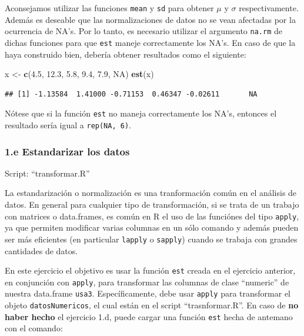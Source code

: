 \documentclass[]{article}
\newenvironment{Shaded}{}{}
\newcommand{\KeywordTok}[1]{\textcolor[rgb]{0.00,0.44,0.13}{\textbf{{#1}}}}
\newcommand{\FloatTok}[1]{\textcolor[rgb]{0.25,0.63,0.44}{{#1}}}
\newcommand{\OtherTok}[1]{\textcolor[rgb]{0.00,0.44,0.13}{{#1}}}
\newcommand{\NormalTok}[1]{{#1}}
\begin{document}
Aconsejamos utilizar las funciones \texttt{mean} y \texttt{sd} para
obtener $\mu$ y $\sigma$ respectivamente. Además es deseable que las
normalizaciones de datos no se vean afectadas por la ocurrencia de NA's.
Por lo tanto, es necesario utilizar el argumento \texttt{na.rm} de
dichas funciones para que \texttt{est} maneje correctamente los NA's. En
caso de que la haya construido bien, debería obtener resultados como el
siguiente:

\begin{Shaded}
\begin{Highlighting}[]
\NormalTok{x <- }\KeywordTok{c}\NormalTok{(}\FloatTok{4.5}\NormalTok{, }\FloatTok{12.3}\NormalTok{, }\FloatTok{5.8}\NormalTok{, }\FloatTok{9.4}\NormalTok{, }\FloatTok{7.9}\NormalTok{, }\OtherTok{NA}\NormalTok{)}
\KeywordTok{est}\NormalTok{(x)}
\end{Highlighting}
\end{Shaded}
\begin{verbatim}
## [1] -1.13584  1.41000 -0.71153  0.46347 -0.02611       NA
\end{verbatim}
Nótese que si la función \texttt{est} no maneja correctamente los NA's,
entonces el resultado sería igual a \texttt{rep(NA, 6)}.

\subsubsection{1.e Estandarizar los datos}

Script: ``transformar.R''

La estandarización o normalización es una tranformación común en el
análisis de datos. En general para cualquier tipo de transformación, si
se trata de un trabajo con matrices o data.frames, es común en R el uso
de las funciónes del tipo \texttt{apply}, ya que permiten modificar
varias columnas en un sólo comando y además pueden ser más eficientes
(en particular \texttt{lapply} o \texttt{sapply}) cuando se trabaja con
grandes cantidades de datos.

En este ejercicio el objetivo es usar la función \texttt{est} creada en
el ejercicio anterior, en conjunción con \texttt{apply}, para
transformar las columnas de clase ``numeric'' de nuestra data.frame
\texttt{usa3}. Específicamente, debe usar \texttt{apply} para
transformar el objeto \texttt{datosNumericos}, el cual están en el
script ``trasnformar.R''. En caso de \textbf{no haber hecho} el
ejercicio 1.d, puede cargar una función \texttt{est} hecha de antemano
con el comando:
\end{document}
